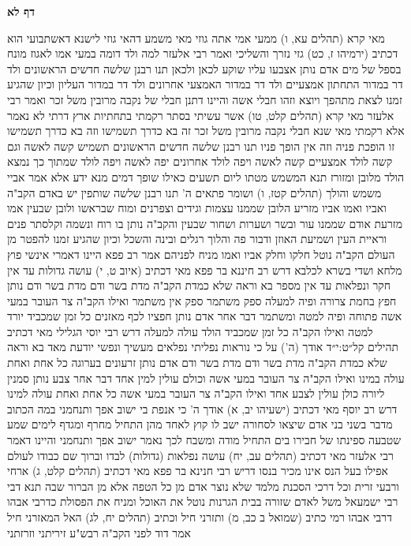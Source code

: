 \documentclass[12pt, openany]{book}
\newcommand{\sethebfont}{
\fontsize{10.5pt}{21.0pt} \selectfont
}
\newcommand{\twocol}[1]{
	{\sethebfont \begin{multicols}{2}
			#1
	\end{multicols}}	
}
\newcommand{\sectname}{}
\newcommand{\newsection}[1]{
	\addcontentsline{toc}{section}{#1}
	\renewcommand{\sectname}{#1}	
	\vspace{-\baselineskip}
	\begin{center}
		\textbf{%
\fontsize{16pt}{16pt}\selectfont
			#1}
	\end{center}
	\vspace{-\baselineskip}
	\nopagebreak
}
\begin{document}
\newsection{דף לא}
\twocol{מאי קרא (תהלים עא, ו) ממעי אמי אתה גוזי מאי משמע דהאי גוזי לישנא דאשתבועי הוא דכתיב (ירמיהו ז, כט) גזי נזרך והשליכי 
ואמר רבי אלעזר למה ולד דומה במעי אמו לאגוז מונח בספל של מים אדם נותן אצבעו עליו שוקע לכאן ולכאן 
תנו רבנן שלשה חדשים הראשונים ולד דר במדור התחתון אמצעיים ולד דר במדור האמצעי אחרונים ולד דר במדור העליון וכיון שהגיע זמנו לצאת מתהפך ויוצא וזהו חבלי אשה 
והיינו דתנן חבלי של נקבה מרובין משל זכר 
ואמר רבי אלעזר מאי קרא (תהלים קלט, טו) אשר עשיתי בסתר רקמתי בתחתיות ארץ דרתי לא נאמר אלא רקמתי
מאי שנא חבלי נקבה מרובין משל זכר זה בא כדרך תשמישו וזה בא כדרך תשמישו זו הופכת פניה וזה אין הופך פניו 
תנו רבנן שלשה חדשים הראשונים תשמיש קשה לאשה וגם קשה לולד אמצעיים קשה לאשה ויפה לולד אחרונים יפה לאשה ויפה לולד שמתוך כך נמצא הולד מלובן ומזורז 
תנא המשמש מטתו ליום תשעים כאילו שופך דמים מנא ידע אלא אמר אביי משמש והולך (תהלים קטז, ו) ושומר פתאים ה' 
תנו רבנן שלשה שותפין יש באדם הקב"ה ואביו ואמו אביו מזריע הלובן שממנו עצמות וגידים וצפרנים ומוח שבראשו ולובן שבעין אמו מזרעת אודם שממנו עור ובשר ושערות ושחור שבעין והקב"ה נותן בו רוח ונשמה וקלסתר פנים וראיית העין ושמיעת האוזן ודבור פה והלוך רגלים ובינה והשכל 
וכיון שהגיע זמנו להפטר מן העולם הקב"ה נוטל חלקו וחלק אביו ואמו מניח לפניהם אמר רב פפא היינו דאמרי אינשי פוץ מלחא ושדי בשרא לכלבא 
דרש רב חיננא בר פפא מאי דכתיב (איוב ט, י) עושה גדולות עד אין חקר ונפלאות עד אין מספר בא וראה שלא כמדת הקב"ה מדת בשר ודם מדת בשר ודם נותן חפץ בחמת צרורה ופיה למעלה ספק משתמר ספק אין משתמר ואילו הקב"ה צר העובר במעי אשה פתוחה ופיה למטה ומשתמר 
דבר אחר אדם נותן חפציו לכף מאזנים כל זמן שמכביד יורד למטה ואילו הקב"ה כל זמן שמכביד הולד עולה למעלה 
דרש רבי יוסי הגלילי מאי דכתיב {תהילים קל״ט:י״ד } אודך (ה') על כי נוראות נפליתי נפלאים מעשיך ונפשי יודעת מאד בא וראה שלא כמדת הקב"ה מדת בשר ודם מדת בשר ודם אדם נותן זרעונים בערוגה כל אחת ואחת עולה במינו ואילו הקב"ה צר העובר במעי אשה וכולם עולין למין אחד 
דבר אחר צבע נותן סמנין ליורה כולן עולין לצבע אחד ואילו הקב"ה צר העובר במעי אשה כל אחת ואחת עולה למינו 
דרש רב יוסף מאי דכתיב (ישעיהו יב, א) אודך ה' כי אנפת בי ישוב אפך ותנחמני במה הכתוב מדבר 
בשני בני אדם שיצאו לסחורה ישב לו קוץ לאחד מהן התחיל מחרף ומגדף לימים שמע שטבעה ספינתו של חבירו בים התחיל מודה ומשבח לכך נאמר ישוב אפך ותנחמני 
והיינו דאמר רבי אלעזר מאי דכתיב (תהלים עב, יח) עושה נפלאות (גדולות) לבדו וברוך שם כבודו לעולם אפילו בעל הנס אינו מכיר בנסו 
דריש רבי חנינא בר פפא מאי דכתיב (תהלים קלט, ג) ארחי ורבעי זרית וכל דרכי הסכנת מלמד שלא נוצר אדם מן כל הטפה אלא מן הברור שבה תנא דבי רבי ישמעאל משל לאדם שזורה בבית הגרנות נוטל את האוכל ומניח את הפסולת 
כדרבי אבהו דרבי אבהו רמי כתיב (שמואל ב כב, מ) ותזרני חיל וכתיב (תהלים יח, לג) האל המאזרני חיל אמר דוד לפני הקב"ה רבש"ע זיריתני וזרזתני 
}
\end{document}
